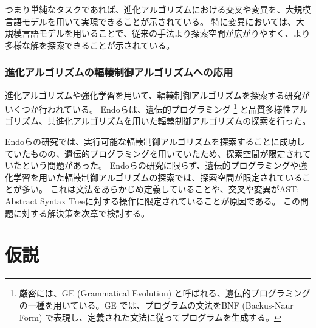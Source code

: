 \documentclass[a4paper,11pt]{jreport}
\begin{document}
つまり単純なタスクであれば、進化アルゴリズムにおける交叉や変異を、大規模言語モデルを用いて実現できることが示されている。
特に変異においては、大規模言語モデルを用いることで、従来の手法より探索空間が広がりやすく、より多様な解を探索できることが示されている。

\subsection{進化アルゴリズムの輻輳制御アルゴリズムへの応用}

進化アルゴリズムや強化学習を用いて、輻輳制御アルゴリズムを探索する研究がいくつか行われている。
Endoら\cite{endo-2022-toward}は、遺伝的プログラミング\cite{holland1992adaptation, gp, gp-foundation}
\footnote{厳密には、GE (Grammatical Evolution) \cite{grammatical-evolution}と呼ばれる、遺伝的プログラミングの一種を用いている。GE では、プログラムの文法をBNF (Backus-Naur Form) で表現し、定義された文法に従ってプログラムを生成する。}
と品質多様性アルゴリズム\cite{quality-diversity}、共進化アルゴリズム\cite{poet, poet-gecco}を用いた輻輳制御アルゴリズムの探索を行った。

Endoらの研究では、実行可能な輻輳制御アルゴリズムを探索することに成功していたものの、遺伝的プログラミングを用いていたため、探索空間が限定されていたという問題があった。
Endoらの研究に限らず、遺伝的プログラミングや強化学習を用いた輻輳制御アルゴリズムの探索では、探索空間が限定されていることが多い。
これは文法をあらかじめ定義していることや、交叉や変異がAST: Abstract Syntax Treeに対する操作に限定されていることが原因である。
この問題に対する解決策を次章で検討する。

\newpage

\chapter{仮説}
\end{document}
